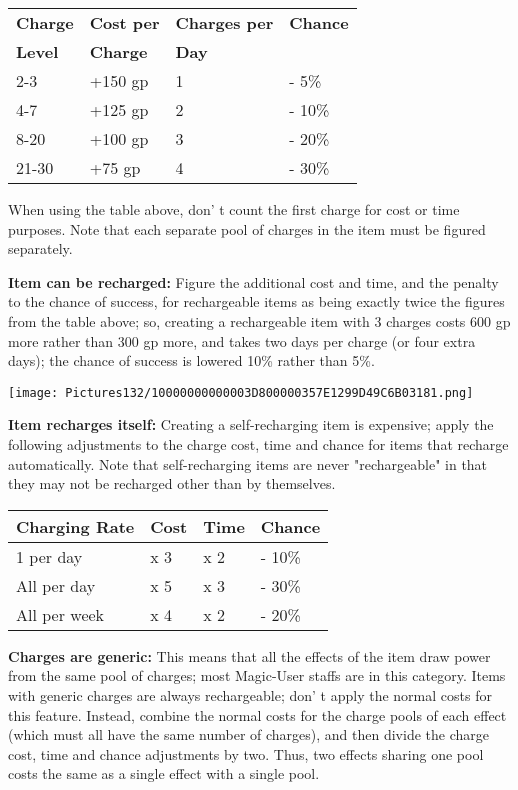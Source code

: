 \documentclass[a4paper,twoside,openany,10pt]{book}
\begin{document}
\begin{multicols}{2}
\begin{tabular*}{0.93\linewidth}{@{\extracolsep{\fill}}llll}
\textbf{Charge} & \textbf{Cost per} & \textbf{Charges per} & \textbf{Chance} \\
\textbf{Level} & \textbf{Charge} & \textbf{Day} &  \\\toprule
2-3 & +150 gp & 1 & - 5\% \\\hline
4-7 & +125 gp & 2 & - 10\% \\\hline
8-20 & +100 gp & 3 & - 20\% \\\hline
21-30 & +75 gp & 4 & - 30\% \\\bottomrule
\end{tabular*}\medskip

When using the table above, don' t count the first charge for cost or time purposes. Note that each separate pool of charges in the item must be figured separately.

\textbf{Item can be recharged:} Figure the additional cost and time, and the penalty to the chance of success, for rechargeable items as being exactly twice the figures from the table above; so, creating a rechargeable item with 3 charges costs 600 gp more rather than 300 gp more, and takes two days per charge (or four extra days); the chance of success is lowered 10\% rather than 5\%.

\begin{center}
	\texttt{[image: Pictures132/10000000000003D800000357E1299D49C6B03181.png]}
\end{center}

\textbf{Item recharges itself:} Creating a self-recharging item is expensive; apply the following adjustments to the charge cost, time and chance for items that recharge automatically. Note that self-recharging items are never "rechargeable" in that they may not be recharged other than by themselves.\medskip

\begin{tabular*}{0.93\linewidth}{@{\extracolsep{\fill}}llll}

\textbf{Charging Rate} & \textbf{Cost} & \textbf{Time} & \textbf{Chance} \\\toprule
1 per day & x 3 & x 2 & - 10\% \\\hline
All per day & x 5 & x 3 & - 30\% \\\hline
All per week & x 4 & x 2 & - 20\% \\\bottomrule
\end{tabular*}\medskip

\textbf{Charges are generic:} This means that all the effects of the item draw power from the same pool of charges; most Magic-User staffs are in this category. Items with generic charges are always rechargeable; don' t apply the normal costs for this feature. Instead, combine the normal costs for the charge pools of each effect (which must all have the same number of charges), and then divide the charge cost, time and chance adjustments by two. Thus, two effects sharing one pool costs the same as a single effect with a single pool. 


\end{multicols}
\end{document}
